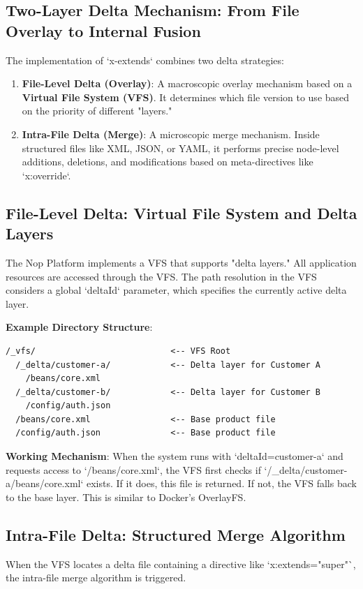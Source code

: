 \documentclass[11pt]{article}
\begin{document}
\subsection{Two-Layer Delta Mechanism: From File Overlay to Internal Fusion}
The implementation of `x-extends` combines two delta strategies:
\begin{enumerate}
    \item \textbf{File-Level Delta (Overlay)}: A macroscopic overlay mechanism based on a \textbf{Virtual File System (VFS)}. It determines which file version to use based on the priority of different "layers."
    \item \textbf{Intra-File Delta (Merge)}: A microscopic merge mechanism. Inside structured files like XML, JSON, or YAML, it performs precise node-level additions, deletions, and modifications based on meta-directives like `x:override`.
\end{enumerate}

\subsection{File-Level Delta: Virtual File System and Delta Layers}
The Nop Platform implements a VFS that supports "delta layers." All application resources are accessed through the VFS. The path resolution in the VFS considers a global `deltaId` parameter, which specifies the currently active delta layer.

\textbf{Example Directory Structure}:
\begin{verbatim}
/_vfs/                           <-- VFS Root
  /_delta/customer-a/            <-- Delta layer for Customer A
    /beans/core.xml
  /_delta/customer-b/            <-- Delta layer for Customer B
    /config/auth.json
  /beans/core.xml                <-- Base product file
  /config/auth.json              <-- Base product file
\end{verbatim}

\textbf{Working Mechanism}:
When the system runs with `deltaId=customer-a` and requests access to `/beans/core.xml`, the VFS first checks if `/\_delta/customer-a/beans/core.xml` exists. If it does, this file is returned. If not, the VFS falls back to the base layer. This is similar to Docker's OverlayFS.

\subsection{Intra-File Delta: Structured Merge Algorithm}
When the VFS locates a delta file containing a directive like `x:extends="super"`, the intra-file merge algorithm is triggered.
\end{document}
